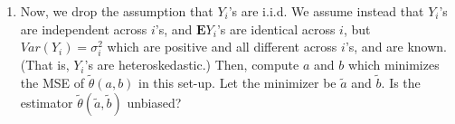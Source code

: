 \documentclass[11pt]{article}
\begin{document}
\begin{enumerate}
\begin{enumerate}
	\item  Now, we drop the assumption that $Y_i$'s are i.i.d. We assume instead that $Y_i$'s are independent across $i$'s, and $\mathbf{E}Y_i$'s are identical across $i$, but $Var(Y_i) = \sigma_i^2$ which are positive and all different across $i$'s, and are known. (That is, $Y_i$'s are heteroskedastic.) Then, compute $a$ and $b$ which minimizes the MSE of $\tilde \theta(a,b)$ in this set-up. Let the minimizer be $\tilde a$ and $\tilde b$. Is the estimator $\tilde \theta(\tilde a,\tilde b)$ unbiased? %
	\end{enumerate}


\end{enumerate}
\end{document}
